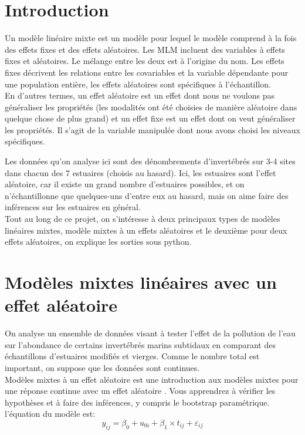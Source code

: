 \documentclass[10pt,a4paper,]{report}
\begin{document}
\begin{spacing}{1}

\tableofcontents

\pagestyle{fancy}
\renewcommand{\footrulewidth}{2pt}
\fancyhf{}
\fancyfoot[C]{\thepage}

\renewcommand{\headrulewidth}{2pt}
\fancyhead[C]{{\rightmark}}
\newpage
\chapter*{Introduction}
Un modèle linéaire mixte est un modèle pour lequel le modèle comprend à la fois des effets fixes et des
effets aléatoires. Les MLM incluent des variables à effets fixes et aléatoires. Le mélange entre les deux est à
l'origine du nom. Les effets fixes décrivent les relations entre les covariables et la variable dépendante pour
une population entière, les effets aléatoires sont spécifiques à l'échantillon.\\
En d'autres termes, un effet aléatoire est un effet dont nous ne voulons pas généraliser les propriétés (les
modalités ont été choisies de manière aléatoire dans quelque chose de plus grand) et un effet fixe est un
effet dont on veut généraliser les propriétés. Il s'agit de la variable manipulée dont nous avons choisi les
niveaux spécifiques.


Les données qu'on analyse ici sont des dénombrements d'invertébrés sur 3-4 sites dans chacun des 7 estuaires (choisis au hasard). Ici, les estuaires sont l'effet aléatoire, car il existe un grand nombre d'estuaires possibles, et on n'échantillonne que quelques-uns d'entre eux au hasard, mais on aime faire des inférences sur les estuaires en général.\\
Tout au long de ce projet, on s'intéresse à deux  principaux types de modèles linéaires mixtes, modèle mixtes à un effets aléatoires et le deuxième pour deux effets aléatoires, on explique les sorties sous python.

\newpage
\chapter*{Modèles mixtes linéaires avec un effet aléatoire }
 On analyse un ensemble de données visant à tester l'effet de la pollution de l'eau sur l'abondance de certains invertébrés marins subtidaux en comparant des échantillons d'estuaires modifiés et vierges. Comme le nombre total est important, on suppose que les données sont continues.
\\
Modèles mixtes à un effet aléatoire est une introduction aux modèles mixtes pour une réponse continue avec un effet aléatoire . Vous apprendrez à vérifier les hypothèses et à faire des inférences, y compris le bootstrap paramétrique.
l'équation du modèle est: $$y_{ij} = \beta_0 + u_{0i} + \beta_1 \times t_{ij} + \varepsilon_{ij}$$


\end{spacing}
\end{document}
